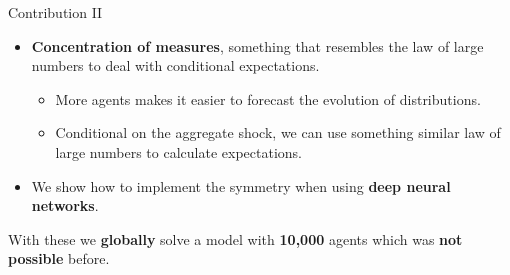 \documentclass[aspectratio=169,10pt]{beamer}
\newcommand{\emphcolor}[1]{\textbf{\textcolor{emphcolorval}{#1}}}
\begin{document}
\begin{frame}{Contribution II}
	\begin{itemize}
	\item \emphcolor{Concentration of measures}, something that resembles the law of large numbers to deal with conditional expectations.\vspace{0.1in}
	\begin{itemize}
		\item More agents makes it easier to forecast the evolution of distributions. \vspace{0.1in}  
		\item Conditional on the aggregate shock, we can use something similar law of large numbers to calculate expectations.  \vspace{0.1in}    
	\end{itemize}	 
	
	
	\item We show how to implement the symmetry when using \emphcolor{deep neural networks}. \vspace{0.1in} 
	
	\end{itemize}
	With these we \emphcolor{globally} solve a model with \emphcolor{10,000} agents which was \emphcolor{not possible} before.
\end{frame}



		
\end{document}

